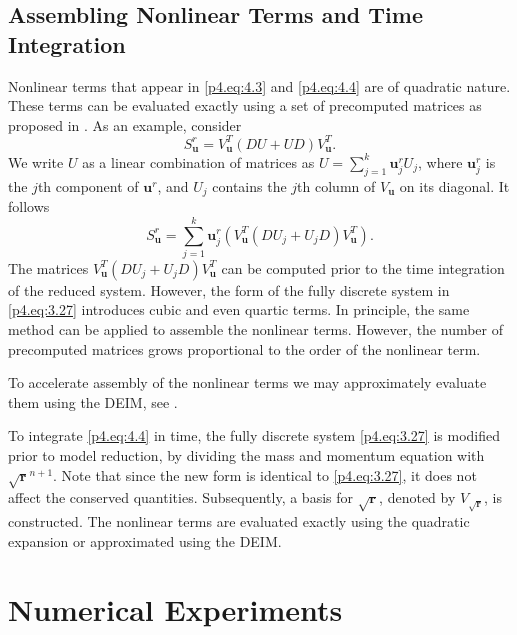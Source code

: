 \subsection{Assembling Nonlinear Terms and Time Integration}
Nonlinear terms that appear in \eqref{p4.eq:4.3} and \eqref{p4.eq:4.4} are of quadratic nature. These terms can be evaluated exactly using a set of precomputed matrices as proposed in \cite{Benner2018}. As an example, consider
\begin{equation}
	S_{\mathbf u}^r = V^T_{\mathbf u} ( DU + UD ) V^T_{\mathbf u}.
\end{equation}
We write $U$ as a linear combination of matrices as $U = \sum_{j=1}^k \mathbf u ^r_j U_j$, where $\mathbf u ^r_j$ is the $j$th component of $\mathbf u ^r$, and $U_j$ contains the $j$th column of $V_{\mathbf u}$ on its diagonal. It follows
\begin{equation}
	S_{\mathbf u}^r = \sum_{j=1}^k \mathbf u ^r_j \left( V^T_{\mathbf u} ( DU_j + U_jD ) V^T_{\mathbf u} \right).
\end{equation}
The matrices $V^T_{\mathbf u} ( DU_j + U_jD ) V^T_{\mathbf u}$ can be computed prior to the time integration of the reduced system. However, the form of the fully discrete system in \eqref{p4.eq:3.27} introduces cubic and even quartic terms. In principle, the same method can be applied to assemble the nonlinear terms. However, the number of precomputed matrices grows proportional to the order of the nonlinear term. 

To accelerate assembly of the nonlinear terms we may approximately evaluate them using the DEIM, see . 

To integrate \eqref{p4.eq:4.4} in time, the fully discrete system \eqref{p4.eq:3.27} is modified prior to model reduction, by dividing the mass and momentum equation with $\sqrt{\mathbf r}^{n+1}$. Note that since the new form is identical to \eqref{p4.eq:3.27}, it does not affect the conserved quantities. Subsequently, a basis for $\sqrt{\mathbf r}$, denoted by $V_{\sqrt{\mathbf r}}$, is constructed. The nonlinear terms are evaluated exactly using the quadratic expansion or approximated using the DEIM.

\section{Numerical Experiments} \label{p4.sec:res}

